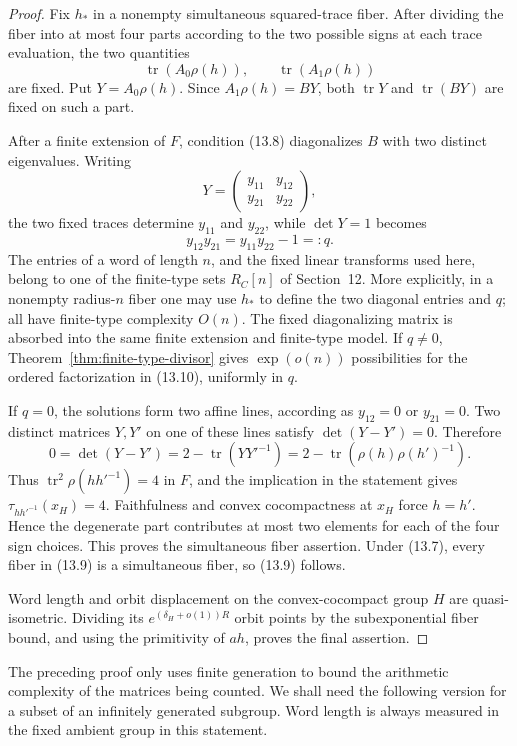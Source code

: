 \documentclass[11pt,reqno]{amsart}
\theoremstyle{definition}
\theoremstyle{remark}
\newcommand{\Tr}{\operatorname{tr}}
\begin{document}
\begin{proof}
Fix \(h_*\) in a nonempty simultaneous squared-trace fiber.  After dividing
the fiber into at most four parts according to the two possible signs at
each trace evaluation, the two quantities
\[
 \Tr(A_0\rho(h)),\qquad
 \Tr(A_1\rho(h))
\]
are fixed.  Put \(Y=A_0\rho(h)\).  Since
\(A_1\rho(h)=BY\), both \(\Tr Y\) and \(\Tr(BY)\) are fixed on such
a part.

After a finite extension of \(F\), condition (13.8) diagonalizes \(B\) with
two distinct eigenvalues.  Writing
\[
 Y=\begin{pmatrix}y_{11}&y_{12}\\y_{21}&y_{22}\end{pmatrix},
\]
the two fixed traces determine \(y_{11}\) and \(y_{22}\), while
\(\det Y=1\) becomes
\[
 y_{12}y_{21}=y_{11}y_{22}-1=:q.
\tag{13.10}
\]
The entries of a word of length \(n\), and the fixed linear transforms
used here, belong to one of the finite-type sets \(R_C[n]\) of
Section~12.  More explicitly, in a nonempty radius-\(n\) fiber one may use
\(h_*\) to define the two diagonal entries and \(q\); all have finite-type
complexity \(O(n)\).  The fixed diagonalizing matrix is absorbed into the
same finite extension and finite-type model.  If \(q\ne0\),
Theorem~\ref{thm:finite-type-divisor} gives
\(\exp(o(n))\) possibilities for the ordered factorization in (13.10),
uniformly in \(q\).

If \(q=0\), the solutions form two affine lines, according as
\(y_{12}=0\) or \(y_{21}=0\).  Two distinct matrices \(Y,Y'\) on one of
these lines satisfy \(\det(Y-Y')=0\).  Therefore
\[
 0=\det(Y-Y')
  =2-\Tr(YY'^{-1})
  =2-\Tr\!\left(\rho(h)\rho(h')^{-1}\right).
\]
Thus \(\Tr^2\rho(hh'^{-1})=4\) in \(F\), and the implication in the statement
gives \(\tau_{hh'^{-1}}(x_H)=4\).  Faithfulness and convex cocompactness at
\(x_H\) force \(h=h'\).  Hence the degenerate part contributes at most two
elements for each of the four sign choices.  This proves the simultaneous
fiber assertion.  Under (13.7), every fiber in (13.9) is a simultaneous
fiber, so (13.9) follows.

Word length and orbit displacement on the convex-cocompact group \(H\) are
quasi-isometric.  Dividing its
\(e^{(\delta_H+o(1))R}\) orbit points by the subexponential fiber bound,
and using the primitivity of \(ah\), proves the final assertion.
\end{proof}

The preceding proof only uses finite generation to bound the arithmetic
complexity of the matrices being counted.  We shall need the following
version for a subset of an infinitely generated subgroup.  Word length is
always measured in the fixed ambient group in this statement.
\end{document}
